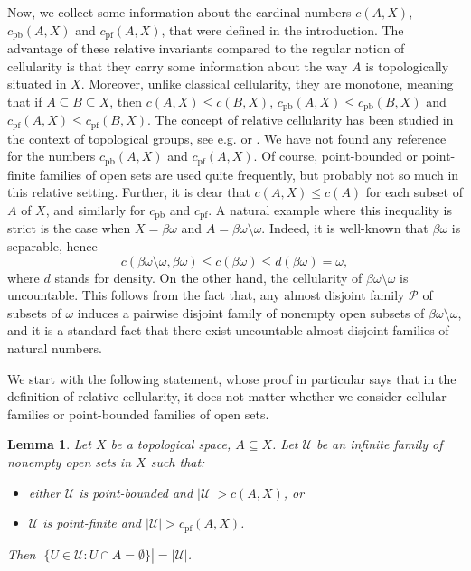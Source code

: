 \documentclass{amsart}
\numberwithin{equation}{section}
\newtheorem{lemma}[thm]{Lemma}
\theoremstyle{definition}
\newcommand{\abs}[1]{\left| #1  \right|}
\begin{document}
Now, we collect some information about the cardinal numbers $c(A, X)$, $c_{\text{pb}}(A, X)$ and $c_{\text{pf}}(A, X)$, that were defined in the introduction. The advantage of these relative invariants compared to the regular notion of cellularity is that they carry some information about the way $A$ is topologically situated in $X$. Moreover, unlike classical cellularity, they are monotone, meaning that if $A \subseteq B \subseteq X$, then $c(A, X) \leq c(B, X)$, $c_{\text{pb}}(A, X) \leq c_{\text{pb}}(B, X)$ and $c_{\text{pf}}(A, X) \leq c_{\text{pf}}(B, X)$. The concept of relative cellularity has been studied in the context of topological groups, see e.g. \cite{PASYNKOV_relative_cellularity} or \cite{gartside-maltsevretral}. We have not found any reference for the numbers $c_{\text{pb}}(A, X)$ and $c_{\text{pf}}(A, X)$. Of course, point-bounded or point-finite families of open sets are used quite frequently, but probably not so much in this relative setting. Further, it is clear that $c(A, X) \leq c(A)$ for each subset of $A$ of $X$, and similarly for $c_{\text{pb}}$ and $c_{\text{pf}}$. A natural example where this inequality is strict is the case when $X=\beta \omega$ and $A=\beta \omega \setminus \omega$. Indeed, it is well-known that $\beta \omega$ is separable, hence 
\[c(\beta \omega \setminus \omega, \beta \omega) \leq c(\beta \omega) \leq d(\beta \omega)=\omega,\]
where $d$ stands for density. On the other hand, the cellularity of $\beta \omega \setminus \omega$ is uncountable. This follows from the fact that, any almost disjoint family $\mathcal{P}$ of subsets of $\omega$ induces a pairwise disjoint family of nonempty open subsets of $\beta \omega \setminus \omega$, and it is a standard fact that there exist uncountable almost disjoint families of natural numbers. 

\iffalse
We start with the following statement, whose proof in particular says that in the definition of relative cellularity, it does not matter whether we consider cellular families or point-bounded families of open sets.

\begin{lemma}
\label{cell}
Let $X$ be a topological space, $A \subseteq X$. Let $\mathcal{U}$ be an infinite family of nonempty open sets in $X$ such that:
\begin{itemize}
\item[(i)] either $\mathcal{U}$ is point-bounded and $\abs{\mathcal{U}}>c(A, X)$, or
\item[(ii)] $\mathcal{U}$ is point-finite and $\abs{\mathcal{U}}>c_{\text{pf}}(A, X)$.
\end{itemize}

 Then $\abs{\{U \in \mathcal{U}: U \cap A = \emptyset\}}=\abs{\mathcal{U}}$.
\end{lemma}
\end{document}

